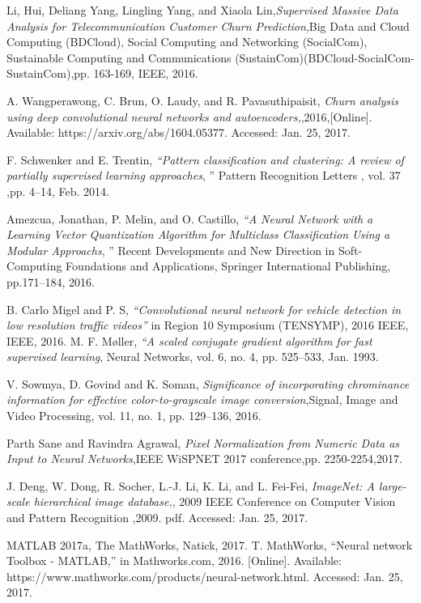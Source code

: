 

{}
\begin{thebibliography}{99}

Li, Hui, Deliang Yang, Lingling Yang, and Xiaola Lin,\emph{Supervised Massive Data Analysis for Telecommunication Customer Churn Prediction},Big Data and Cloud Computing (BDCloud), Social Computing and Networking (SocialCom), Sustainable Computing and Communications (SustainCom)(BDCloud-SocialCom-SustainCom),pp. 163-169, IEEE, 2016.

 A. Wangperawong, C. Brun, O. Laudy, and R. Pavasuthipaisit, \emph{Churn analysis using deep convolutional neural networks and autoencoders,},2016,[Online]. Available: https://arxiv.org/abs/1604.05377.
 Accessed: Jan. 25, 2017.
 
 F. Schwenker and E. Trentin, \emph{“Pattern classification and clustering: A review of partially supervised learning approaches}, ” Pattern Recognition Letters , vol. 37 ,pp. 4–14, Feb. 2014.

Amezcua, Jonathan, P. Melin, and O. Castillo, \emph{“A Neural Network with a Learning Vector Quantization Algorithm for Multiclass Classification Using a Modular Approachs}, ” Recent Developments and New Direction in Soft-Computing Foundations and Applications, Springer International Publishing,  pp.171–184, 2016.

B. Carlo Migel and P. S, \emph{“Convolutional neural network for vehicle detection in low resolution traffic videos”} in Region 10 Symposium (TENSYMP), 2016 IEEE, IEEE, 2016.
M. F. Møller, \emph{“A scaled conjugate gradient algorithm for fast supervised learning}, Neural Networks, vol. 6, no. 4, pp. 525–533, Jan. 1993.

V. Sowmya, D. Govind and K. Soman, \emph{Significance of incorporating chrominance information for effective color-to-grayscale image conversion},Signal, Image and Video Processing, vol. 11, no. 1, pp. 129–136,
2016.

Parth Sane and Ravindra Agrawal, \emph{Pixel Normalization from Numeric Data
	as Input to Neural Networks},IEEE WiSPNET 2017 conference,pp. 2250-2254,2017.

J. Deng, W. Dong, R. Socher, L.-J. Li, K. Li, and L. Fei-Fei, \emph{ImageNet: A large-scale hierarchical image database,}, 2009 IEEE Conference on Computer Vision and Pattern Recognition ,2009.
pdf. Accessed: Jan. 25, 2017.

MATLAB 2017a, The MathWorks, Natick, 2017.
T. MathWorks, “Neural network Toolbox - MATLAB,” in Mathworks.com, 2016. [Online]. Available: https://www.mathworks.com/products/neural-network.html. Accessed: Jan. 25, 2017.
\end{thebibliography}

